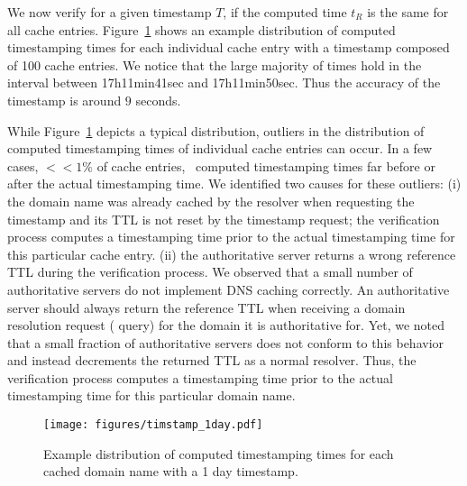 We now verify for a given timestamp $T$, if the computed time $t_R$ is the same for all cache entries. Figure~\ref{fig:timestamp1day} shows an example distribution of computed timestamping times for each individual cache entry with a timestamp composed of 100 cache entries. We notice that the large majority of times hold in the interval between 17h11min41sec and 17h11min50sec. Thus the accuracy of the timestamp is around $9$ seconds. 

While Figure~\ref{fig:timestamp1day} depicts a typical distribution, outliers in the distribution of computed  timestamping times of individual cache entries can occur. 
In a few cases, $<< 1\%$ of cache entries, \DNStamp\ computed timestamping times far before or after the actual timestamping time. 
We identified two causes for these outliers: 
(i) the domain name was already cached by the resolver when requesting the timestamp and its TTL is not reset by the timestamp request; the verification process computes a timestamping time prior to the actual timestamping time for this particular cache entry.
(ii) the authoritative server returns a wrong reference TTL during the verification process. 
We observed that a small number of authoritative servers do not implement DNS caching correctly. An authoritative server should always return the reference TTL when receiving a domain resolution request ( query) for the domain it is authoritative for. Yet, we noted that a small fraction of authoritative servers does not conform to this behavior and instead decrements the returned TTL as a normal resolver. Thus, the verification process computes a timestamping time prior to the actual timestamping time for this particular domain name.

\begin{figure}
\begin{center}
\texttt{[image: figures/timstamp\_1day.pdf]}
\caption{Example distribution of computed timestamping times for each cached domain name with a 1 day timestamp.}
\label{fig:timestamp1day}
\end{center}
\end{figure}

